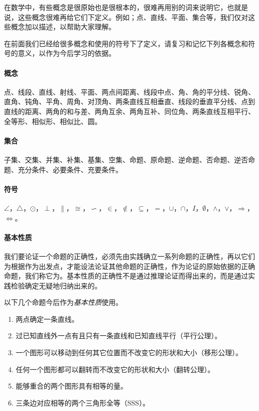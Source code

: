 在数学中，有些概念是很原始也是很根本的，很难再用别的词来说明它，也就是说，这些概念很难再给它们下定义。例如；点、直线、平面、集合等，我们仅对这些概念加以描述，以帮助大家理解。

在前面我们已经给很多概念和使用的符号下了定义，请复习和记忆下列各概念和符号的意义，以作为今后学习的依据。

\paragraph{概念} 点、线段、直线、射线、平面、两点间距离、线段中点、角、角的平分线、锐角、直角、钝角、平角、周角、对顶角、两条直线互相垂直、线段的垂直平分线、点到直线的距离、两角的和与差、两角互余、两角互补、同位角、两条直线互相平行、全等形、相似形、相似比、圆。

\paragraph{集合} 子集、交集、并集、补集、基集、空集、命题、原命题、逆命题、否命题、逆否命题、充分条件、必要条件、充要条件。

\paragraph{符号} $\angle$，$\triangle$，$\odot$，$\perp$，$\parallel$，$\cong$，$\backsim$，$\in$，$\notin$，$\subseteq$，$=$，$\cup$，$\cap$，$I$，$\emptyset$，$\wedge$，$\vee$，$\Rightarrow$，$\Leftrightarrow$。

\paragraph{基本性质}

我们要论证一个命题的正确性，必须先由实践确立一系列命题的正确性，再以它们为根据作为出发点，才能设法论证其他命题的正确性，作为论证的原始依据的正确命题，我们称它为。基本性质的正确性不是通过推理论证而得出来的，而是通过实践检验确定无疑地归纳出来的。

以下几个命题今后作为\emph{基本性质}使用。

\begin{enumerate}
	\item 两点确定一条直线。
	\item 过已知直线外一点有且只有一条直线和已知直线平行（平行公理）。
	\item 一个图形可以移动到任何其它位置而不改变它的形状和大小（移形公理）。
	\item 任何一个图形都可以翻转而不改变它的形状和大小（翻转公理）。
	\item 能够重合的两个图形具有相等的量。
	\item  三条边对应相等的两个三角形全等（SSS）。
\end{enumerate}

